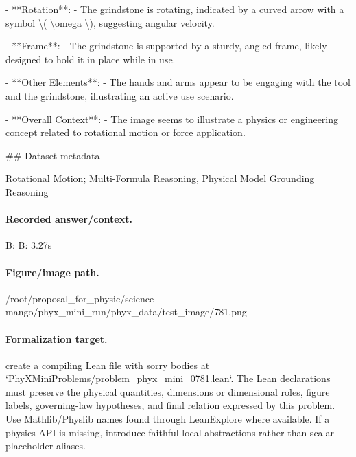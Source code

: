 - **Rotation**:
  - The grindstone is rotating, indicated by a curved arrow with a symbol \textbackslash{}( \textbackslash{}omega \textbackslash{}), suggesting angular velocity.

- **Frame**:
  - The grindstone is supported by a sturdy, angled frame, likely designed to hold it in place while in use.

- **Other Elements**:
  - The hands and arms appear to be engaging with the tool and the grindstone, illustrating an active use scenario.

- **Overall Context**:
  - The image seems to illustrate a physics or engineering concept related to rotational motion or force application.

\#\# Dataset metadata

Rotational Motion; Multi-Formula Reasoning, Physical Model Grounding Reasoning

\paragraph{Recorded answer/context.}
B: B: 3.27s

\paragraph{Figure/image path.}
/root/proposal\_for\_physic/science-mango/phyx\_mini\_run/phyx\_data/test\_image/781.png

\paragraph{Formalization target.}
create a compiling Lean file with sorry bodies at `PhyXMiniProblems/problem\_phyx\_mini\_0781.lean`. The Lean declarations must preserve the physical quantities, dimensions or dimensional roles, figure labels, governing-law hypotheses, and final relation expressed by this problem.
Use Mathlib/Physlib names found through LeanExplore where available. If a physics API is missing, introduce faithful local abstractions rather than scalar placeholder aliases.

